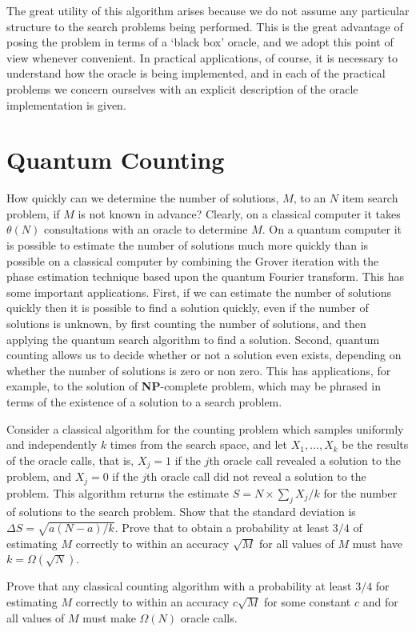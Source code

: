 The great utility of this algorithm arises because we do not assume any particular structure to the search problems being performed. This is the great advantage of posing the problem in terms of a `black box' oracle, and we adopt this point of view whenever convenient. In practical applications, of course, it is necessary to understand how the oracle is being implemented, and in each of the practical problems we concern ourselves with an explicit description of the oracle implementation is given. 
\section{Quantum Counting}
How quickly can we determine the number of solutions, $M$, to an $N$ item search problem, if $M$ is not known in advance? Clearly, on a classical computer it takes $\theta(N)$ consultations with an oracle to determine $M$. On a quantum computer it is possible to estimate the number of solutions much more quickly than is possible on a classical computer by combining the Grover iteration with the phase estimation technique based upon the quantum Fourier transform. This has some important applications. First, if we can estimate the number of solutions quickly then it is possible to find a solution quickly, even if the number of solutions is unknown, by first counting the number of solutions, and then applying the quantum search algorithm to find a solution. Second, quantum counting allows us to decide whether or not a solution even exists, depending on whether the number of solutions is zero or non zero. This has applications, for example, to the solution of \textbf{NP}-complete problem, which may be phrased in terms of the existence of a solution to a search problem.

\begin{example}
Consider a classical algorithm for the counting problem which samples uniformly and independently $k$ times from the search space, and let $X_1, \ldots, X_k$ be the results of the oracle calls, that is, $X_j=1$ if the $j$th oracle call revealed a solution to the problem, and $X_j=0$ if the $j$th oracle call did not reveal a solution to the problem. This algorithm returns the estimate $S=N \times \sum_j X_j/k$ for the number of solutions to the search problem. Show that the standard deviation is $\Delta S=\sqrt{a(N-a)/k}$. Prove that to obtain a probability at least $3/4$ of estimating $M$ correctly to within an accuracy $\sqrt{M}$ for all values of $M$ must have $k=\Omega(\sqrt{N})$.
\end{example}
\begin{example}
    Prove that any classical counting algorithm with a probability at least $3/4$ for estimating $M$ correctly to within an accuracy $c\sqrt{M}$ for some constant $c$ and for all values of $M$ must make $\Omega(N)$ oracle calls.
\end{example}


